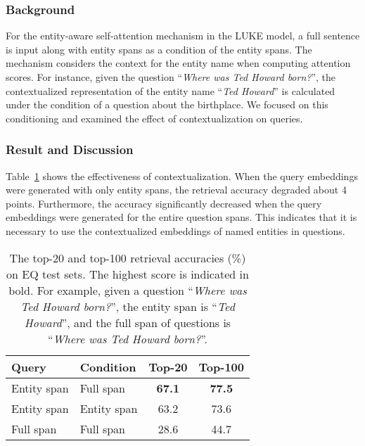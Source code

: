 \documentclass[letterpaper]{article} \usepackage{aaai23}  \usepackage{times}  \usepackage{helvet}  \usepackage{courier}  \usepackage[hyphens]{url}  \usepackage{graphicx} \urlstyle{rm} \def\UrlFont{\rm}  \usepackage{natbib}  \usepackage{caption} \frenchspacing  \setlength{\pdfpagewidth}{8.5in}  \setlength{\pdfpageheight}{11in}  \usepackage{algorithm}
\begin{document}
\subsubsection{Background}
For the entity-aware self-attention mechanism in the LUKE model, a full sentence is input along with entity spans as a condition of the entity spans.
The mechanism considers the context for the entity name when computing attention scores.
For instance, given the question ``\textit{Where was Ted Howard born?}'', the contextualized representation of the entity name ``\textit{Ted Howard}'' is calculated under the condition of a question about the birthplace.
We focused on this conditioning and examined the effect of contextualization on queries.

\subsubsection{Result and Discussion}
Table~\ref{tab:conditioning} shows the effectiveness of contextualization.
When the query embeddings were generated with only entity spans, the retrieval accuracy degraded about 4 points.
Furthermore, the accuracy significantly decreased when the query embeddings were generated for the entire question spans.
This indicates that it is necessary to use the contextualized embeddings of named entities in questions.


\begin{table}[t]
	\centering
	\begin{tabular}{llcc}
		\toprule
		\textbf{Query} & \textbf{Condition} & \textbf{Top-20} & \textbf{Top-100} \\
		\midrule
		Entity span    & Full span          & \textbf{67.1}   & \textbf{77.5}    \\
		Entity span    & Entity span        & 63.2            & 73.6             \\
		Full span      & Full span          & 28.6            & 44.7             \\
		\bottomrule
	\end{tabular}
	\caption{
		The top-20 and top-100 retrieval accuracies (\%) on EQ test sets. The highest score is indicated in bold.
		For example, given a question ``\textit{Where was Ted Howard born?}'', the entity span is ``\textit{Ted Howard}'', and the full span of questions is ``\textit{Where was Ted Howard born?}''.
	}
	\label{tab:conditioning}
\end{table}
\end{document}
